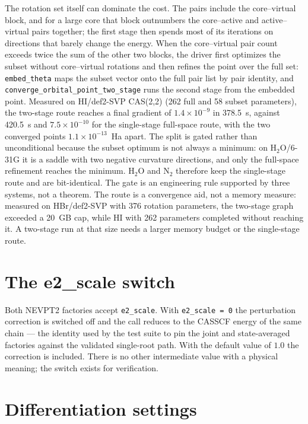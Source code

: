 The rotation set itself can dominate the cost.  The pairs include the
core--virtual block, and for a large core that block outnumbers the
core--active and active--virtual pairs together; the first stage then
spends most of its iterations on directions that barely change the
energy.  When the core--virtual pair count exceeds twice the sum of the
other two blocks, the driver first optimizes the subset without
core--virtual rotations and then refines the point over the full set:
\texttt{embed\_theta} maps the subset vector onto the full pair list by
pair identity, and \texttt{converge\_orbital\_point\_two\_stage} runs
the second stage from the embedded point.  Measured on HI/def2-SVP
CAS(2,2) (262 full and 58 subset parameters), the two-stage route reaches
a final gradient of $1.4\times10^{-9}$ in 378.5~s, against 420.5~s and
$7.5\times10^{-10}$ for the single-stage full-space route, with the two
converged points $1.1\times10^{-13}$~Ha apart.  The split is gated
rather than unconditional because the subset optimum is not always a
minimum: on H$_2$O/6-31G it is a saddle with two negative curvature
directions, and only the full-space refinement reaches the minimum.
H$_2$O and N$_2$ therefore keep the single-stage route and are
bit-identical.  The gate is an engineering rule supported by three
systems, not a theorem.  The route is a convergence aid, not a memory
measure: measured on HBr/def2-SVP with 376 rotation parameters, the
two-stage graph exceeded a 20~GB cap, while HI with 262 parameters
completed without reaching it.  A two-stage run at that size needs a
larger memory budget or the single-stage route.

\section{The e2\_scale switch}

Both NEVPT2 factories accept \texttt{e2\_scale}.  With
\texttt{e2\_scale = 0} the perturbation correction is switched off and
the call reduces to the CASSCF energy of the same chain --- the
identity used by the test suite to pin the joint and state-averaged
factories against the validated single-root path.  With the default
value of $1.0$ the correction is included.  There is no other
intermediate value with a physical meaning; the switch exists for
verification.

\section{Differentiation settings}

